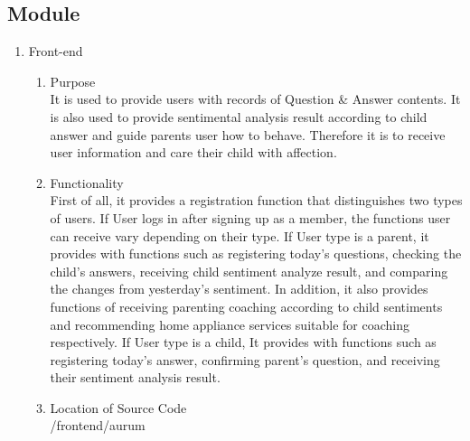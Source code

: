 \documentclass[conference]{IEEEtran}
\begin{document}
\subsection{Module}
\begin{enumerate}
    \item Front-end
       \begin{enumerate}
           \item Purpose
           \\It is used to provide users with records of Question \& Answer contents. It is also used to provide sentimental analysis result according to child answer and guide parents user how to behave. Therefore it is to receive user information and care their child with affection.
           
           \item Functionality
           \\First of all, it provides a registration function that distinguishes two types of users. If User logs in after signing up as a member, the functions user can receive vary depending on their type. If User type is a parent, it provides with functions such as registering today's questions, checking the child's answers, receiving child sentiment analyze result, and comparing the changes from yesterday's sentiment. In addition, it also provides functions of receiving parenting coaching according to child sentiments and recommending home appliance services suitable for coaching respectively. If User type is a child, It provides with functions such as registering today's answer, confirming parent's question, and receiving their sentiment analysis result.

           \item Location of Source Code
           \\/frontend/aurum


\end{enumerate}
\end{enumerate}
\end{document}
